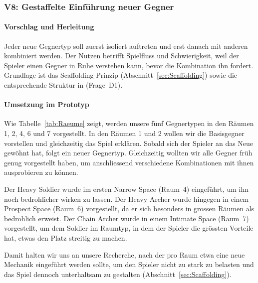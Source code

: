 \documentclass[../Main.tex]{subfiles}
\begin{document}
\subsubsection{V8: Gestaffelte Einführung neuer Gegner} \label{sec:V8}

\paragraph{Vorschlag und Herleitung}
Jeder neue Gegnertyp soll zuerst isoliert auftreten und erst danach mit anderen kombiniert werden. Der Nutzen betrifft Spielfluss und Schwierigkeit, weil der Spieler einen Gegner in Ruhe verstehen kann, bevor die Kombination ihn fordert. Grundlage ist das Scaffolding-Prinzip (Abschnitt~\ref{sec:Scaffolding}) sowie die entsprechende Struktur in  (Frage~D1).

\paragraph{Umsetzung im Prototyp}
Wie Tabelle~\ref{tab:Raeume} zeigt, werden unsere fünf Gegnertypen in den Räumen 1, 2, 4, 6 und 7 vorgestellt. In den Räumen 1 und 2 wollen wir die Basisgegner vorstellen und gleichzeitig das Spiel erklären. Sobald sich der Spieler an das Neue gewöhnt hat, folgt ein neuer Gegnertyp. Gleichzeitig wollten wir alle Gegner früh genug vorgestellt haben, um anschliessend verschiedene Kombinationen mit ihnen ausprobieren zu können.

Der Heavy Soldier wurde im ersten Narrow Space (Raum~4) eingeführt, um ihn noch bedrohlicher wirken zu lassen. Der Heavy Archer wurde hingegen in einem Prospect Space (Raum~6) vorgestellt, da er sich besonders in grossen Räumen als bedrohlich erweist. Der Chain Archer wurde in einem Intimate Space (Raum~7) vorgestellt, um dem Soldier im Raumtyp, in dem der Spieler die grössten Vorteile hat, etwas den Platz streitig zu machen.

Damit halten wir uns an unsere Recherche, nach der pro Raum etwa eine neue Mechanik eingeführt werden sollte, um den Spieler nicht zu stark zu belasten und das Spiel dennoch unterhaltsam zu gestalten (Abschnitt~\ref{sec:Scaffolding}).
\end{document}
